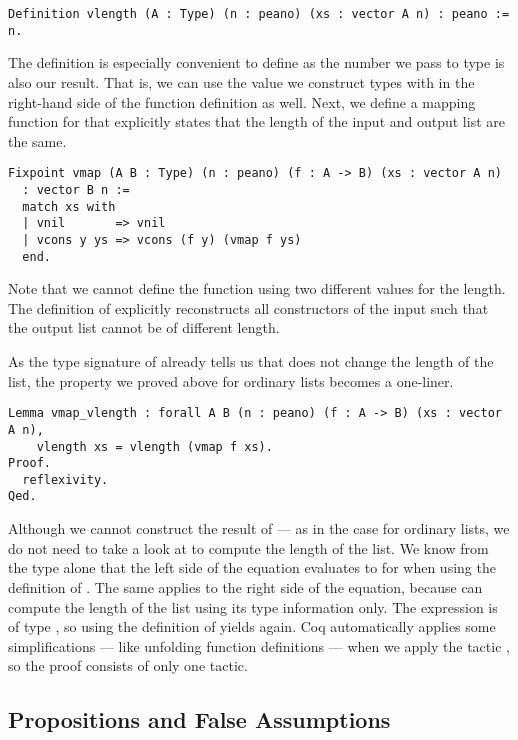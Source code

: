 \begin{verbatim}
Definition vlength (A : Type) (n : peano) (xs : vector A n) : peano := n.
\end{verbatim}

The definition is especially convenient to define as the  number  we pass to type  is also our result.
That is, we can use the value we construct types with in the right-hand side of the function definition as well.
Next, we define a mapping function for  that explicitly states that the length of the input and output list are the same.

\begin{verbatim}
Fixpoint vmap (A B : Type) (n : peano) (f : A -> B) (xs : vector A n)
  : vector B n :=
  match xs with
  | vnil       => vnil
  | vcons y ys => vcons (f y) (vmap f ys)
  end.
\end{verbatim}

Note that we cannot define the function using two different values for the length.
The definition of  explicitly reconstructs all constructors of the input  such that the output list cannot be of different length.

As the type signature of  already tells us that  does not change the length of the list, the property we proved above for ordinary lists becomes a one-liner.

\begin{verbatim}
Lemma vmap_vlength : forall A B (n : peano) (f : A -> B) (xs : vector A n),
    vlength xs = vlength (vmap f xs).
Proof.
  reflexivity.
Qed.
\end{verbatim}

Although we cannot construct the result of  --- as in the case for ordinary lists, we do not need to take a look at  to compute the length of the list.
We know from the type alone that the left side of the equation evaluates to  for  when using the definition of .
The same applies to the right side of the equation, because  can compute the length of the list using its type information only.
The expression  is of type , so using the definition of  yields  again.
Coq automatically applies some simplifications --- like unfolding function definitions --- when we apply the tactic , so the proof consists of only one tactic.

\subsection{Propositions and False Assumptions}

